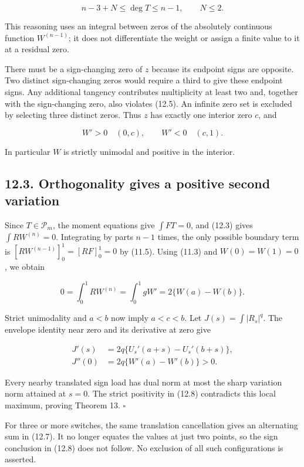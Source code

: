 \documentclass[11pt]{article}
\begin{document}
\[
n-3+N\le\deg T\le n-1,\qquad N\le2.
\tag{12.5}
\]

This reasoning uses an integral between zeros of the absolutely
continuous function \(W^{(n-1)}\); it does not differentiate the weight
or assign a finite value to it at a residual zero.

There must be a sign-changing zero of \(z\) because its endpoint signs
are opposite. Two distinct sign-changing zeros would require a third to
give these endpoint signs. Any additional tangency contributes
multiplicity at least two and, together with the sign-changing zero,
also violates (12.5). An infinite zero set is excluded by selecting
three distinct zeros. Thus \(z\) has exactly one interior zero \(c\),
and

\[
W'>0\quad(0,c),\qquad W'<0\quad(c,1).
\tag{12.6}
\]

In particular \(W\) is strictly unimodal and positive in the interior.

\subsection{12.3. Orthogonality gives a positive second
variation}\label{orthogonality-gives-a-positive-second-variation}

Since \(T\in\mathcal P_m\), the moment equations give \(\int FT=0\), and
(12.3) gives \(\int RW^{(n)}=0\). Integrating by parts \(n-1\) times,
the only possible boundary term is \([RW^{(n-1)}]_0^1=[RF]_0^1=0\) by
(11.5). Using (11.3) and \(W(0)=W(1)=0\), we obtain

\[
0=\int_0^1RW^{(n)}
=\int_0^1gW'=2\{W(a)-W(b)\}.
\tag{12.7}
\]

Strict unimodality and \(a<b\) now imply \(a<c<b\). Let
\(J(s)=\int|R_s|^q\). The envelope identity near zero and its derivative
at zero give

\[
\begin{aligned}
J'(s)&=2q\{U_s'(a+s)-U_s'(b+s)\},\\
J''(0)&=2q\{W'(a)-W'(b)\}>0.
\end{aligned}
\tag{12.8}
\]

Every nearby translated sign load has dual norm at most the sharp
variation norm attained at \(s=0\). The strict positivity in (12.8)
contradicts this local maximum, proving Theorem 13. \(\square\)

For three or more switches, the same translation cancellation gives an
alternating sum in (12.7). It no longer equates the values at just two
points, so the sign conclusion in (12.8) does not follow. No exclusion
of all such configurations is asserted.
\end{document}
